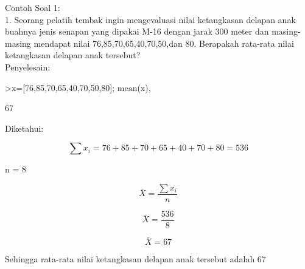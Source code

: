 \documentclass[a4paper,10pt]{article}
\begin{document}
\begin{eulernotebook}
\begin{eulercomment}
Contoh Soal 1:\\
1. Seorang pelatih tembak ingin mengevaluasi nilai ketangkasan delapan
anak buahnya jenis senapan yang dipakai M-16 dengan jarak 300 meter
dan masing-masing mendapat nilai 76,85,70,65,40,70,50,dan 80.
Berapakah rata-rata nilai ketangkasan delapan anak tersebut?\\
Penyelesain:
\end{eulercomment}
\begin{eulerprompt}
>x=[76,85,70,65,40,70,50,80]; mean(x),
\end{eulerprompt}
\begin{euleroutput}
  67
\end{euleroutput}
\begin{eulercomment}
Diketahui:\\
\end{eulercomment}
\begin{eulerformula}
\[
\sum x_i={76+85+70+65+40+70+80}=536
\]
\end{eulerformula}
\begin{eulerttcomment}
                 n = 8
\end{eulerttcomment}
\begin{eulerformula}
\[
\bar{X} = \frac{\sum x_i}{n}
\]
\end{eulerformula}
\begin{eulerformula}
\[
\bar{X} = \frac{536}{8}
\]
\end{eulerformula}
\begin{eulerformula}
\[
\bar{X} = 67
\]
\end{eulerformula}
\begin{eulercomment}
Sehingga rata-rata nilai ketangkasan delapan anak tersebut adalah 67


\end{eulercomment}
\end{eulernotebook}
\end{document}
